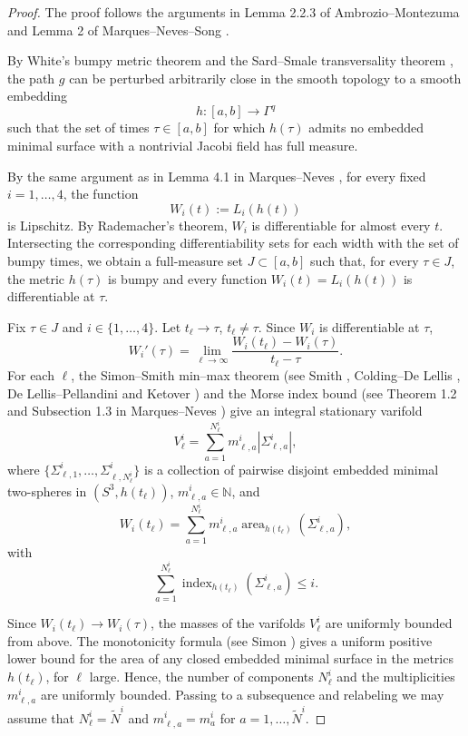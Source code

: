 \documentclass[12pt,english]{amsart}
\theoremstyle{definition}
\begin{document}
\begin{proof}
The proof follows the arguments in Lemma 2.2.3 of Ambrozio--Montezuma \cite{AM} and Lemma 2 of Marques--Neves--Song \cite{MNS}.

By White's bumpy metric theorem \cite{W1,W} and the Sard--Smale transversality theorem \cite{Sm}, the path \(g\) can be perturbed arbitrarily close in the smooth topology to a smooth embedding
\[
h:[a,b]\to \Gamma^q
\]
such that the set of times \(\tau\in[a,b]\) for which \(h(\tau)\) admits no embedded minimal surface with a nontrivial Jacobi field has full measure.

By the same argument as in Lemma 4.1 in Marques--Neves \cite{MN}, for every fixed \(i=1,\ldots,4\), the function
\[
W_i(t):=L_i(h(t))
\]
is Lipschitz. By Rademacher's theorem, \(W_i\) is differentiable for
almost every \(t\). Intersecting the corresponding differentiability sets for each width with the set of bumpy times, we obtain a full-measure set \(J\subset[a,b]\) such that, for every \(\tau\in J\), the metric \(h(\tau)\) is bumpy and every function \(W_i(t)=L_i(h(t))\) is differentiable at \(\tau\).

Fix \(\tau\in J\) and \(i\in\{1,\ldots,4\}\). Let \(t_\ell\to \tau\), \(t_\ell\ne\tau\).
Since \(W_i\) is differentiable at \(\tau\),
\[
W_i'(\tau)
=
\lim_{\ell\to\infty}
\frac{W_i(t_\ell)-W_i(\tau)}{t_\ell-\tau}.
\]
For each \(\ell\), the Simon--Smith min--max theorem (see Smith \cite{SS}, Colding--De Lellis \cite{CD}, De Lellis--Pellandini \cite{DP} and Ketover \cite{K}) and the Morse index bound (see Theorem 1.2 and Subsection 1.3 in Marques--Neves \cite{MN1}) give an integral stationary varifold
\[
V^i_\ell
=
\sum_{a=1}^{N^i_\ell}
m^i_{\ell,a}|\Sigma^i_{\ell,a}|,
\]
where \(\bigl\{\Sigma^i_{\ell,1},\ldots,\Sigma^i_{\ell,N^i_\ell}\bigr\}\) is a collection of pairwise disjoint embedded minimal two-spheres in
\((S^3,h(t_\ell))\), \(m^i_{\ell,a}\in\mathbb N\), and
\[
W_i(t_\ell)
=
\sum_{a=1}^{N^i_\ell}
m^i_{\ell,a}\operatorname{area}_{h(t_\ell)}(\Sigma^i_{\ell,a}),
\]
with
\[
\sum_{a=1}^{N^i_\ell}
\operatorname{index}_{h(t_\ell)}(\Sigma^i_{\ell,a})
\le i.
\]

Since \(W_i(t_\ell)\to W_i(\tau)\), the masses of the varifolds \(V^i_\ell\) are uniformly bounded from above. The monotonicity formula (see Simon \cite{Si}) gives a uniform positive lower bound for the area
of any closed embedded minimal surface in the metrics \(h(t_\ell)\), for \(\ell\) large. Hence, the number of components \(N^i_\ell\) and the multiplicities \(m^i_{\ell,a}\) are uniformly bounded. Passing to a subsequence and relabeling we may assume that \(N^i_\ell=\widetilde N^i\) and \(m^i_{\ell,a} = m^i_a\) for \(a=1,\ldots,\widetilde N^i\).


\end{proof}
\end{document}
